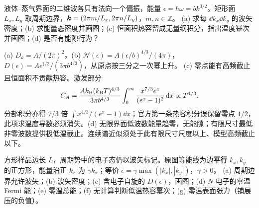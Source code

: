 \begin{exercise}
液体--蒸气界面的二维波各只有法向一个偏振，能量 $\epsilon=\hbar\omega=bk^{3/2}$。矩形面 $L_x,L_y$ 取周期边界，$\boldsymbol{k}=(2\pi m/L_x,2\pi n/L_y)$，$m,n\in\mathbb Z$。
(a) 求每 $\dd k_x\dd k_y$ 的波矢密度；(b) 求能量态密度并画图；(c) 恒面积热容留成无量纲积分，指出温度幂次并画图；(d) 是否有能隙行为？
\end{exercise}
\begin{solution}
(a) $D_k=A/(2\pi)^2$。(b) $\mathcal N(\epsilon)=A(\epsilon/b)^{4/3}/(4\pi)$，$D(\epsilon)=A\epsilon^{1/3}/(3\pi b^{4/3})$，从原点按三分之一次幂上升。
(c) 零点能有高频截止且恒面积不贡献热容。激发部分
\[C_A=\frac{Ak_{\mathrm B}(k_{\mathrm B} T)^{4/3}}{3\pi b^{4/3}}\int_0^\infty\frac{x^{7/3}e^x}{(e^x-1)^2}\,\mathrm d x\propto T^{4/3}.\]
分部积分亦得 $7/3$ 倍 $\int x^{4/3}/(e^x-1)\dd x$；官方第一条热容积分误保留零点 $1/2$，此项求温度导数必须消失。(d) 无限界面低波数能量趋零，无能隙；有限尺寸最低非零波数提供极低温截止。连续谱近似须处于此有限尺寸尺度以上、模型高频截止以下。
\end{solution}
\begin{center}\hspace{.3cm}\end{center}
\begin{exercise}
方形样品边长 $L$，周期势中的电子态仍以波矢标记。原图等能线为边\textbf{平行} $k_x,k_y$ 的正方形，能量沿正 $k_x$ 为 $\gamma k_x$；等价 $\epsilon=\gamma\max(|k_x|,|k_y|)$，$\gamma>0$。
(a) 周期边界允许波矢；(b) 波矢密度；(c) 含电子自旋的 $D(\epsilon)$，画图；(d) $N$ 电子的零温 Fermi 能；(e) 零温总能；(f) 无计算判断低温热容幂次；(g) 零温表面张力（铺展压的负值）。
\end{exercise}
